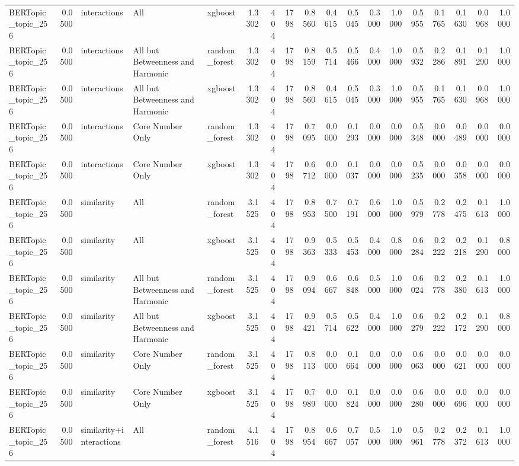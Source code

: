 \begin{tabular}{lrlllrrrrrrrrrrrrr}
BERTopic_topic_256 & 0.0500 & interactions & All & xgboost & 1.3302 & 404 & 1798 & 0.8560 & 0.4615 & 0.5045 & 0.3000 & 1.0000 & 0.5955 & 0.1765 & 0.1630 & 0.0968 & 1.0000 \\
BERTopic_topic_256 & 0.0500 & interactions & All but Betweenness and Harmonic & random_forest & 1.3302 & 404 & 1798 & 0.8159 & 0.5714 & 0.5466 & 0.4000 & 1.0000 & 0.5932 & 0.2286 & 0.1891 & 0.1290 & 1.0000 \\
BERTopic_topic_256 & 0.0500 & interactions & All but Betweenness and Harmonic & xgboost & 1.3302 & 404 & 1798 & 0.8560 & 0.4615 & 0.5045 & 0.3000 & 1.0000 & 0.5955 & 0.1765 & 0.1630 & 0.0968 & 1.0000 \\
BERTopic_topic_256 & 0.0500 & interactions & Core Number Only & random_forest & 1.3302 & 404 & 1798 & 0.7095 & 0.0000 & 0.1293 & 0.0000 & 0.0000 & 0.5348 & 0.0000 & 0.0489 & 0.0000 & 0.0000 \\
BERTopic_topic_256 & 0.0500 & interactions & Core Number Only & xgboost & 1.3302 & 404 & 1798 & 0.6712 & 0.0000 & 0.1037 & 0.0000 & 0.0000 & 0.5235 & 0.0000 & 0.0358 & 0.0000 & 0.0000 \\
BERTopic_topic_256 & 0.0500 & similarity & All & random_forest & 3.1525 & 404 & 1798 & 0.8953 & 0.7500 & 0.7191 & 0.6000 & 1.0000 & 0.5979 & 0.2778 & 0.2475 & 0.1613 & 1.0000 \\
BERTopic_topic_256 & 0.0500 & similarity & All & xgboost & 3.1525 & 404 & 1798 & 0.9363 & 0.5333 & 0.5453 & 0.4000 & 0.8000 & 0.6284 & 0.2222 & 0.2218 & 0.1290 & 0.8000 \\
BERTopic_topic_256 & 0.0500 & similarity & All but Betweenness and Harmonic & random_forest & 3.1525 & 404 & 1798 & 0.9094 & 0.6667 & 0.6848 & 0.5000 & 1.0000 & 0.6024 & 0.2778 & 0.2380 & 0.1613 & 1.0000 \\
BERTopic_topic_256 & 0.0500 & similarity & All but Betweenness and Harmonic & xgboost & 3.1525 & 404 & 1798 & 0.9421 & 0.5714 & 0.5622 & 0.4000 & 1.0000 & 0.6279 & 0.2222 & 0.2172 & 0.1290 & 0.8000 \\
BERTopic_topic_256 & 0.0500 & similarity & Core Number Only & random_forest & 3.1525 & 404 & 1798 & 0.8113 & 0.0000 & 0.1664 & 0.0000 & 0.0000 & 0.6063 & 0.0000 & 0.0621 & 0.0000 & 0.0000 \\
BERTopic_topic_256 & 0.0500 & similarity & Core Number Only & xgboost & 3.1525 & 404 & 1798 & 0.7989 & 0.0000 & 0.1824 & 0.0000 & 0.0000 & 0.6280 & 0.0000 & 0.0696 & 0.0000 & 0.0000 \\
BERTopic_topic_256 & 0.0500 & similarity+interactions & All & random_forest & 4.1516 & 404 & 1798 & 0.8954 & 0.6667 & 0.7057 & 0.5000 & 1.0000 & 0.5961 & 0.2778 & 0.2372 & 0.1613 & 1.0000 \\

\end{tabular}
